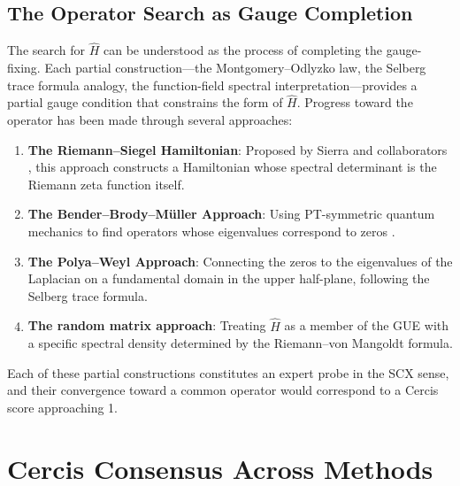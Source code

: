 \documentclass[12pt,a4paper]{article}
\theoremstyle{remark}
\begin{document}
\subsection{The Operator Search as Gauge Completion}
\label{sec:operator_search}
The search for $\widehat{H}$ can be understood as the process of completing
the gauge-fixing. Each partial construction---the Montgomery--Odlyzko law,
the Selberg trace formula analogy, the function-field spectral
interpretation---provides a partial gauge condition that constrains the
form of $\widehat{H}$.
Progress toward the operator has been made through several approaches:
\begin{enumerate}
  \item \textbf{The Riemann--Siegel Hamiltonian}: Proposed by Sierra and
        collaborators \cite{Sierra2019}, this approach constructs a
        Hamiltonian whose spectral determinant is the Riemann zeta function
        itself.
  \item \textbf{The Bender--Brody--M\"uller Approach}: Using PT-symmetric
        quantum mechanics to find operators whose eigenvalues correspond to
        zeros \cite{BenderBrodyMueller2017}.
  \item \textbf{The Polya--Weyl Approach}: Connecting the zeros to the
        eigenvalues of the Laplacian on a fundamental domain in the
        upper half-plane, following the Selberg trace formula.
  \item \textbf{The random matrix approach}: Treating $\widehat{H}$ as a
        member of the GUE with a specific spectral density determined by
        the Riemann--von Mangoldt formula.
\end{enumerate}
Each of these partial constructions constitutes an expert probe in the SCX
sense, and their convergence toward a common operator would correspond to
a Cercis score approaching 1.
\section{Cercis Consensus Across Methods}
\label{sec:cercis}
\end{document}
